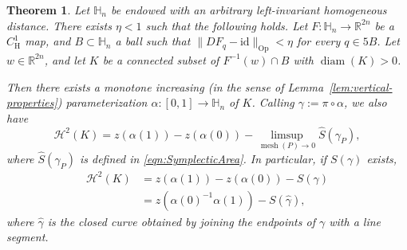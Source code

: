 \documentclass[12pt,reqno]{amsart}
\newcommand{\cH}{\mathcal{H}}
\DeclareMathOperator{\mesh}{mesh}
\newcommand{\HH}{\mathbb{H}}
\newcommand{\from}{\colon}
\newtheorem{thm}{Theorem}[section]
\theoremstyle{remark}
\newcommand{\0}{\mathbf{0}}
\renewcommand{\1}{\mathbf 1}
\DeclareMathOperator{\diam}{diam}
\begin{document}
\begin{thm}\label{thm:S-cH2}
  Let $\HH_n$ be endowed with an arbitrary left-invariant homogeneous distance. There exists $\eta<1$ such that the following holds. Let $F\from \HH_n\to\mathbb R^{2n}$ be a $C^1_{\mathrm{H}}$ map, and $B\subset\HH_n$ a ball such that $\|DF_q-\mathrm{id}\|_{\mathrm{Op}}<\eta$ for every $q\in 5B$. Let $w\in\mathbb R^{2n}$, and let $K$ be a connected subset of $F^{-1}(w)\cap B$ with $\diam(K)>0$. 
  
  Then there exists a monotone increasing (in the sense of Lemma~\ref{lem:vertical-properties}) parameterization $\alpha\from [0,1]\to\HH_n$ of $K$. Calling $\gamma:=\pi\circ \alpha$, we also have \begin{equation}\label{eqn:PreAreaFormulaVerticalFibers}
  \cH^2(K)=z(\alpha(1))-z(\alpha(0))-\limsup_{\mesh(P)\to 0}\hat S(\gamma_P),
  \end{equation}
  where $\hat S(\gamma_P)$ is defined in \eqref{eqn:SymplecticArea}. In particular, if $S(\gamma)$ exists,
  \begin{equation}\label{eqn:AreaFormulaVerticalFibers}
  \begin{aligned}
  \cH^2(K)&=z(\alpha(1))-z(\alpha(0))-S(\gamma) \\
  &=z(\alpha(0)^{-1}\alpha(1))-S(\hat\gamma),
  \end{aligned}
  \end{equation}
  where $\hat\gamma$ is the closed curve obtained by joining the endpoints of $\gamma$ with a line segment.
\end{thm}
\end{document}
